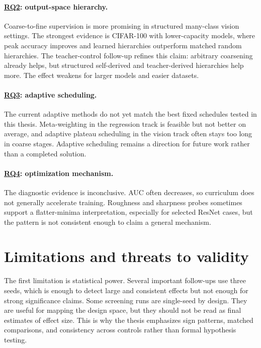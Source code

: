 \documentclass[english,master,a4paper,oneside]{ppfcmthesis}
\begin{document}
\paragraph{\hyperref[rq:vision]{RQ2}: output-space hierarchy.}
Coarse-to-fine supervision is more promising in structured many-class vision
settings. The strongest evidence is CIFAR-100 with lower-capacity models, where
peak accuracy improves and learned hierarchies outperform matched random
hierarchies. The teacher-control follow-up refines this claim: arbitrary
coarsening already helps, but structured self-derived and teacher-derived
hierarchies help more. The effect weakens for larger models and easier datasets.

\paragraph{\hyperref[rq:adaptive]{RQ3}: adaptive scheduling.}
The current adaptive methods do not yet match the best fixed schedules tested in
this thesis. Meta-weighting in the regression track is feasible but not better on
average, and adaptive plateau scheduling in the vision track often stays too long
in coarse stages. Adaptive scheduling remains a direction for future work rather
than a completed solution.

\paragraph{\hyperref[rq:diagnostics]{RQ4}: optimization mechanism.}
The diagnostic evidence is inconclusive. AUC often decreases, so curriculum does
not generally accelerate training. Roughness and sharpness probes sometimes
support a flatter-minima interpretation, especially for selected ResNet cases,
but the pattern is not consistent enough to claim a general mechanism.

\section{Limitations and threats to validity}

The first limitation is statistical power. Several important follow-ups use
three seeds, which is enough to detect large and consistent effects but not
enough for strong significance claims. Some screening runs are single-seed by
design. They are useful for mapping the design space, but they should not be
read as final estimates of effect size. This is why the thesis emphasizes sign
patterns, matched comparisons, and consistency across controls rather than
formal hypothesis testing.
\end{document}
